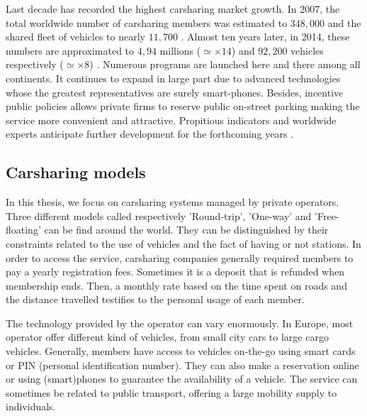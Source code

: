 \begin{bibunit}[ieeetr]
\medskip
Last decade has recorded the highest carsharing market growth.
In 2007, the total worldwide number of carsharing members was estimated to $348,000$ and the shared fleet of vehicles to nearly $11,700$ \cite{shaheen_growth_2007}.
Almost ten years later, in 2014, these numbers are approximated to $4,94$ millions ($\simeq \times 14$) and $92,200$ vehicles respectively ($\simeq \times 8$) \cite{statista_carsharingNumbers}.
Numerous programs are launched here and there among all continents.
It continues to expand in large part due to advanced technologies whose the greatest representatives are surely smart-phones.
Besides, incentive public policies allows private firms to reserve public on-street parking making the service more convenient and attractive.
Propitious indicators and worldwide experts anticipate further development for the forthcoming years \cite{shaheen_carsharing_2013}.







\subsection{Carsharing models}
In this thesis, we focus on carsharing systems managed by private operators.
Three different models called respectively 'Round-trip', 'One-way' and 'Free-floating' can be find around the world.
They can be distinguished by their constraints related to the use of vehicles and the fact of having or not stations.
In order to access the service, carsharing companies generally required members to pay a yearly registration fees.
Sometimes it is a deposit that is refunded when membership ends.
Then, a monthly rate based on the time spent on roads and the distance travelled testifies to the personal usage of each member.

\medskip
The technology provided by the operator can vary enormously.
In Europe, most operator offer different kind of vehicles, from small city cars to large cargo vehicles.
Generally, members have access to vehicles on-the-go using smart cards or PIN (personal identification number).
They can also make a reservation online or using (smart)phones to guarantee the availability of a vehicle.
The service can sometimes be related to public transport, offering a large mobility supply to individuals.


\end{bibunit}
